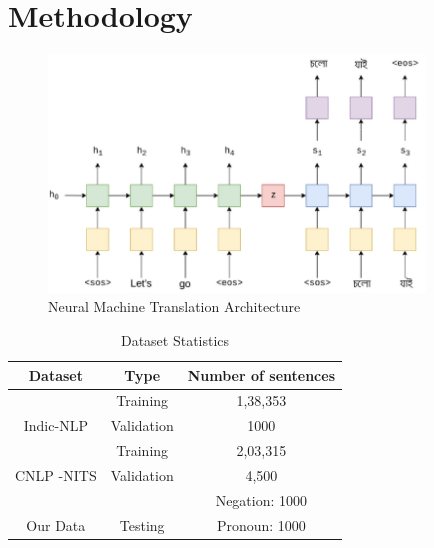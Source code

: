 \chapter{Methodology}

\begin{figure}[h]
\label{NMT}
\centering
\includegraphics[width=10cm]{nmt.png}
\caption{Neural Machine Translation Architecture}
\end{figure}


\begin{table}[h]
\caption{ Dataset Statistics }
\label{asdata}
\centering
\begin{tabular}{|c|c|c|}
\hline
\textbf{Dataset}             & \textbf{Type}                     & \textbf{Number of sentences} \\ \hline
                             & {\color[HTML]{000000} Training}   & 1,38,353                     \\ \cline{2-3} 
\multirow{-2}{*}{Indic-NLP}  & {\color[HTML]{000000} Validation} & 1000                         \\ \hline
                             & Training                          & 2,03,315                     \\ \cline{2-3} 
\multirow{-2}{*}{CNLP -NITS} & Validation                        & 4,500                        \\ \hline
                             &                                   & Negation: 1000               \\ \cline{3-3} 
\multirow{-2}{*}{Our Data}   & \multirow{-2}{*}{Testing}         & Pronoun: 1000                \\ \hline
\end{tabular}
\end{table}

                                




